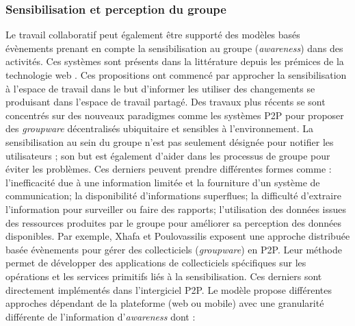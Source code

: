 \subsubsection{Sensibilisation et perception du groupe}
Le travail collaboratif peut également être supporté des modèles basés 
évènements prenant en compte la sensibilisation au groupe (\textit{awareness}) 
dans des activités. Ces systèmes sont présents dans la littérature depuis les 
prémices de la technologie web \cite{Bentley1997,Steinfield1999,You2001}. Ces 
propositions ont commencé par approcher la sensibilisation à l'espace de travail 
dans le but d'informer les utiliser des changements se produisant dans l'espace 
de travail partagé. 
Des travaux plus récents se sont concentrés sur des 
nouveaux paradigmes comme les systèmes \gls{P2P} pour proposer des 
\textit{groupware} décentralisés ubiquitaire et sensibles à l'environnement. La sensibilisation au sein du groupe n'est pas seulement désignée 
pour notifier les utilisateurs ; son but est également d'aider dans les processus de 
groupe pour éviter les problèmes. Ces derniers peuvent prendre différentes 
formes comme :  l'inefficacité due à une information limitée et la fourniture d'un 
système de communication; la disponibilité d'informations superflues; la difficulté 
d'extraire l'information pour surveiller ou faire des rapports; l'utilisation des 
données issues  des ressources produites par le groupe pour améliorer sa 
perception des données disponibles. Par exemple, Xhafa et Poulovassilis 
\cite{Xhafa2010} exposent une approche distribuée basée évènements pour gérer 
des collecticiels (\textit{groupware}) en \gls{P2P}. 
Leur méthode permet de développer des applications de collecticiels spécifiques  
sur les opérations et les services primitifs liés à la sensibilisation. Ces derniers 
sont directement implémentés dans l'intergiciel \gls{P2P}. Le modèle propose 
différentes approches dépendant de la plateforme (web ou mobile) avec une 
granularité différente de l'information 
d'\textit{awareness} dont :

